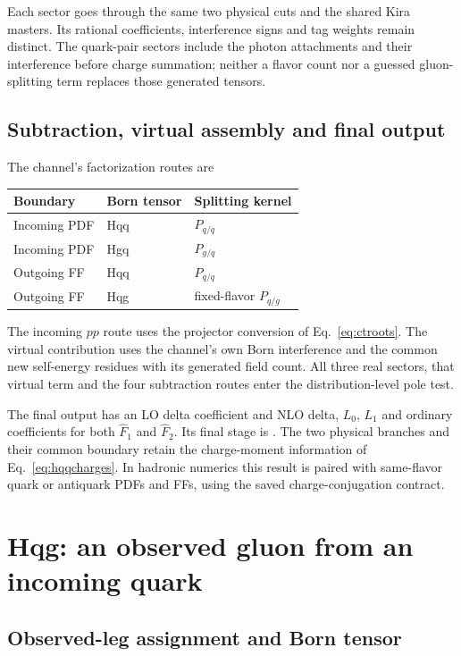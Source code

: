 \documentclass[11pt,a4paper]{article}
\newcommand{\Fhat}{\widehat F}
\begin{document}
Each sector goes through the same two physical cuts and the shared Kira
masters. Its rational coefficients, interference signs and tag weights
remain distinct. The quark-pair sectors include the photon attachments
and their interference before charge summation; neither a flavor count
nor a guessed gluon-splitting term replaces those generated tensors.

\subsection{Subtraction, virtual assembly and final output}

The channel's factorization routes are
\begin{center}
\begin{tabular}{@{}lll@{}}
\toprule
Boundary & Born tensor & Splitting kernel\\
\midrule
Incoming PDF & Hqq & $P_{q/q}$\\
Incoming PDF & Hgq & $P_{g/q}$\\
Outgoing FF & Hqq & $P_{q/q}$\\
Outgoing FF & Hqg & fixed-flavor $P_{q/g}$\\
\bottomrule
\end{tabular}
\end{center}
The incoming $pp$ route uses the projector conversion of
Eq.~\eqref{eq:ctroots}. The virtual contribution uses the channel's
own Born interference and the common new self-energy residues with its
generated field count. All three real sectors, that virtual term and
the four subtraction routes enter the distribution-level pole test.

The final output has an LO delta coefficient and NLO delta, $L_0$,
$L_1$ and ordinary coefficients for both $\Fhat_1$ and $\Fhat_2$.
Its final stage is . The two physical branches
and their common boundary retain the charge-moment information of
Eq.~\eqref{eq:hqqcharges}. In hadronic numerics this result is paired
with same-flavor quark or antiquark PDFs and FFs, using the saved
charge-conjugation contract.

\section{Hqg: an observed gluon from an incoming quark}
\label{sec:hqg}

\subsection{Observed-leg assignment and Born tensor}
\end{document}
